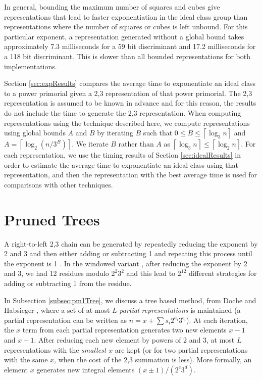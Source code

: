 \documentclass{ucalgthes1}
\theoremstyle{definition}
\newcommand{\ceil}[1]{\left\lceil #1 \right\rceil}
\begin{document}
In general, bounding the maximum number of squares and cubes give representations that lead to faster exponentiation in the ideal class group than representations where the number of squares or cubes is left unbound.  For this particular exponent, a representation generated without a global bound takes approximately 7.3 milliseconds for a 59 bit discriminant and 17.2 milliseconds for a 118 bit discriminant.  This is slower than all bounded representations for both implementations.

Section \ref{sec:expResults} compares the average time to exponentiate an ideal class to a power primorial given a 2,3 representation of that power primorial.  The 2,3 representation is assumed to be known in advance and for this reason, the results do not include the time to generate the 2,3 representation.  When computing representations using the technique described here, we compute representations using global bounds $A$ and $B$ by iterating $B$ such that $0 \le B \le \ceil{\log_3 n}$ and $A = \ceil{\log_2 (n/3^B)}$.  We iterate $B$ rather than $A$ as $\ceil{\log_3 n} \le \ceil{\log_2 n}$.  For each representation, we use the timing results of Section \ref{sec:idealResults} in order to estimate the average time to exponentiate an ideal class using that representation, and then the representation with the best average time is used for comparisons with other techniques.

\section{Pruned Trees}
\label{sec:expGreedyTrees}

A right-to-left 2,3 chain can be generated by repeatedly reducing the exponent by 2 and 3 and then either adding or subtracting 1 and repeating this process until the exponent is 1 \cite[Figure 8]{Ciet2006}.  In the windowed variant \cite{Doche2006}, after reducing the exponent by 2 and 3, we had 12 residues modulo $2^2 3^2$ and this lead to $2^{12}$ different strategies for adding or subtracting 1 from the residue.

In Subsection \ref{subsec:pm1Tree}, we discuss a tree based method, from Doche and Habsieger \cite{Doche2008}, where a set of at most $L$ \emph{partial representations} is maintained (a partial representation can be written as $n = x + \sum s_i2^{a_i}3^{b_i}$).  At each iteration, the $x$ term from each partial representation generates two new elements $x-1$ and $x+1$.  After reducing each new element by powers of 2 and 3, at most $L$ representations with the \emph{smallest} $x$ are kept (or for two partial representations with the same $x$, when the cost of the 2,3 summation is less).  More formally, an element $x$ generates new integral elements $(x \pm 1)/(2^c3^d)$.
\end{document}
